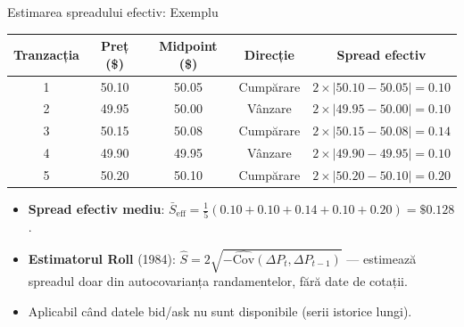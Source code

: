 \documentclass[9pt, aspectratio=169, t]{beamer}
\theoremstyle{definition}
\begin{document}
\begin{frame}{Estimarea spreadului efectiv: Exemplu}
\begin{center}
{\small
\renewcommand{\arraystretch}{1.2}
\begin{tabular}{ccccc}
\toprule
\textbf{Tranzacția} & \textbf{Preț} (\$) & \textbf{Midpoint} (\$) & \textbf{Direcție} & \textbf{Spread efectiv} \\
\midrule
1 & 50.10 & 50.05 & Cumpărare & $2 \times |50.10 - 50.05| = 0.10$ \\
2 & 49.95 & 50.00 & Vânzare & $2 \times |49.95 - 50.00| = 0.10$ \\
3 & 50.15 & 50.08 & Cumpărare & $2 \times |50.15 - 50.08| = 0.14$ \\
4 & 49.90 & 49.95 & Vânzare & $2 \times |49.90 - 49.95| = 0.10$ \\
5 & 50.20 & 50.10 & Cumpărare & $2 \times |50.20 - 50.10| = 0.20$ \\
\bottomrule
\end{tabular}
}
\end{center}
\vspace{0.1cm}
\begin{itemize}\small\setlength{\itemsep}{1pt}
    \item \textbf{Spread efectiv mediu}: $\bar{S}_{\text{eff}} = \frac{1}{5}(0.10+0.10+0.14+0.10+0.20) = \$0.128$.
    \item \textbf{Estimatorul Roll} (1984): $\hat{S} = 2\sqrt{-\widehat{\text{Cov}}(\Delta P_t, \Delta P_{t-1})}$ --- estimează spreadul doar din autocovarianța randamentelor, fără date de cotații.
    \item Aplicabil când datele bid/ask nu sunt disponibile (serii istorice lungi).
\end{itemize}
\end{frame}
\end{document}
